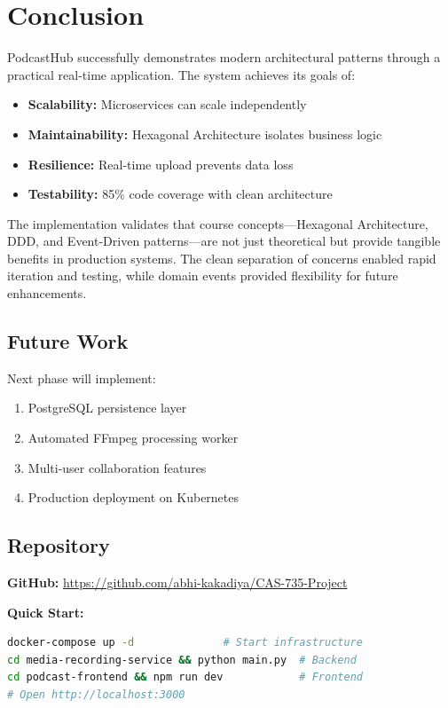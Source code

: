 \documentclass[12pt,a4paper]{article}
\begin{document}
\section{Conclusion}

PodcastHub successfully demonstrates modern architectural patterns through a practical real-time application. The system achieves its goals of:

\begin{itemize}[noitemsep]
    \item \textbf{Scalability:} Microservices can scale independently
    \item \textbf{Maintainability:} Hexagonal Architecture isolates business logic
    \item \textbf{Resilience:} Real-time upload prevents data loss
    \item \textbf{Testability:} 85\% code coverage with clean architecture
\end{itemize}

The implementation validates that course concepts—Hexagonal Architecture, DDD, and Event-Driven patterns—are not just theoretical but provide tangible benefits in production systems. The clean separation of concerns enabled rapid iteration and testing, while domain events provided flexibility for future enhancements.

\subsection{Future Work}

Next phase will implement:
\begin{enumerate}[noitemsep]
    \item PostgreSQL persistence layer
    \item Automated FFmpeg processing worker
    \item Multi-user collaboration features
    \item Production deployment on Kubernetes
\end{enumerate}

\subsection{Repository}

\textbf{GitHub:} \url{https://github.com/abhi-kakadiya/CAS-735-Project}

\textbf{Quick Start:}
\begin{lstlisting}[language=bash, basicstyle=\ttfamily\scriptsize]
docker-compose up -d              # Start infrastructure
cd media-recording-service && python main.py  # Backend
cd podcast-frontend && npm run dev            # Frontend
# Open http://localhost:3000
\end{lstlisting}
\end{document}
